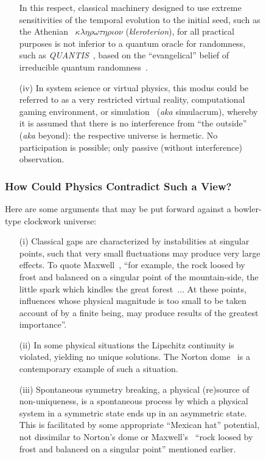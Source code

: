 \documentclass[entropy,article,accept,oneauthor,pdftex]{Definitions/mdpi}
\begin{document}
\begin{figure}[H]
\begin{itemize}
In this respect, classical machinery designed to use
extreme sensitivities of the temporal evolution to the initial seed,
 such as the Athenian~\cite{dow_aristotlekleroteria_1939}
$\kappa \lambda \eta \rho \omega \tau \eta \rho \iota o \nu$
({\it kleroterion}),
for all practical purposes is not inferior to a quantum oracle
for randomness, such as {\it QUANTIS}~\cite{Quantis},
based on the ``evangelical'' belief of irreducible quantum randomness~\cite{zeil-05_nature_ofQuantum}.


\item[(iv)]
In system science or virtual physics, this modus could be referred to as a very restricted virtual reality,
computational gaming environment, or simulation~\cite{toffoli:79,fredkin,svozil-nat-acad,Bostrom-sim} ({\it aka} simulacrum),
whereby it is assumed that there is
no interference from ``the outside'' ({\it aka} beyond): the respective universe is hermetic.
No participation is possible; only passive (without interference) observation.
\end{itemize}

\subsubsection{How Could Physics Contradict Such a View?}

Here are some arguments that may be put forward against a bowler-type clockwork universe:

\begin{itemize}


\item[(i)]
Classical gaps are characterized by instabilities at singular points, such that very small
fluctuations may produce very large effects.
To quote Maxwell~\cite[pp.~211,212]{Campbell-1882},
``for example, the rock loosed by frost and balanced on a singular point of the mountain-side, the little spark which
kindles the great forest~$\ldots$ At these
points, influences whose physical magnitude is too small to be taken account of by a finite being, may produce
results of the greatest importance''.

\item[(ii)]
In some physical situations the
Lipschitz continuity is violated, yielding no unique solutions.
The Norton dome~\cite{Norton-dome-2008,vanStrien2014} is a
contemporary example of such a situation.

\item[(iii)]
Spontaneous symmetry breaking,
a physical (re)source of non-uniqueness,
is a spontaneous process
by which a physical system in a symmetric state ends up in an asymmetric state.
This is facilitated by some appropriate ``Mexican hat'' potential,
not dissimilar to Norton's dome or
Maxwell's~\cite[pp.~211,212]{Campbell-1882}
``rock loosed by frost and balanced on a singular point'' mentioned earlier.


\end{itemize}
\end{figure}
\end{document}
